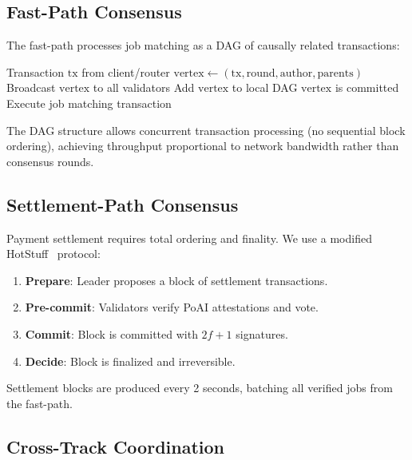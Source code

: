 \documentclass[11pt,twocolumn]{article}
\begin{document}
\subsection{Fast-Path Consensus}

The fast-path processes job matching as a DAG of causally related transactions:

\begin{algorithm}[H]
\caption{Fast-Path DAG Consensus}
\label{alg:fastpath}
\begin{algorithmic}[1]
\Require Transaction $\text{tx}$ from client/router
\State $\text{vertex} \gets (\text{tx}, \text{round}, \text{author}, \text{parents})$
\State Broadcast $\text{vertex}$ to all validators
\State {}
\State Add $\text{vertex}$ to local DAG
\State {}
    \State $\text{vertex}$ is committed
    \State Execute job matching transaction
\EndIf
\end{algorithmic}
\end{algorithm}

The DAG structure allows concurrent transaction processing (no sequential block ordering), achieving throughput proportional to network bandwidth rather than consensus rounds.

\subsection{Settlement-Path Consensus}

Payment settlement requires total ordering and finality. We use a modified HotStuff~\cite{yin2019hotstuff} protocol:

\begin{enumerate}[leftmargin=1.4em]
    \item \textbf{Prepare}: Leader proposes a block of settlement transactions.
    \item \textbf{Pre-commit}: Validators verify PoAI attestations and vote.
    \item \textbf{Commit}: Block is committed with $2f+1$ signatures.
    \item \textbf{Decide}: Block is finalized and irreversible.
\end{enumerate}

Settlement blocks are produced every 2 seconds, batching all verified jobs from the fast-path.

\subsection{Cross-Track Coordination}
\end{document}
